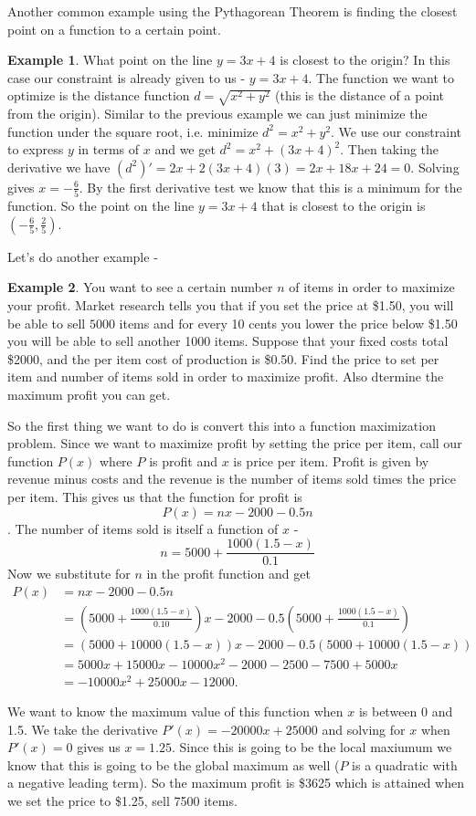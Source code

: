 \documentclass[12pt,reqno]{article}
\theoremstyle{definition}
\newtheorem*{Example}{Example}
\begin{document}
	Another common example using the Pythagorean Theorem is finding the closest point on a function to a certain point. 
	\begin{Example}
		What point on the line $y = 3x + 4$ is closest to the origin? In this case our constraint is already given to us - $y = 3x + 4$. The function we want to optimize is the distance function $d = \sqrt{x^2 + y^2}$ (this is the distance of a point from the origin). Similar to the previous example we can just minimize the function under the square root, i.e. minimize $d^2 = x^2 + y^2$. We use our constraint to express $y$ in terms of $x$ and we get $d^2 = x^2 + (3x + 4)^2$. Then taking the derivative we have $(d^2)' = 2x + 2(3x + 4)(3) = 2x + 18x + 24 = 0$. Solving gives $x = -\frac{6}{5}$. By the first derivative test we know that this is a minimum for the function. So the point on the line $y = 3x + 4$ that is closest to the origin is $\left(-\frac{6}{5}, \frac{2}{5}\right)$. 
	\end{Example}
	
	Let's do another example - 
	\begin{Example}
		You want to see a certain number $n$ of items in order to maximize your profit. Market research tells you that if you set the price at \$1.50, you will be able to sell $5000$ items and for every 10 cents you lower the price below \$1.50 you will be able to sell another 1000 items. Suppose that your fixed costs total \$2000, and the per item cost of production is \$0.50. Find the price to set per item and number of items sold in order to maximize profit. Also dtermine the maximum profit you can get. 
		
		So the first thing we want to do is convert this into a function maximization problem. Since we want to maximize profit by setting the price per item, call our function $P(x)$ where $P$ is profit and $x$ is price per item. Profit is given by revenue minus costs and the revenue is the number of items sold times the price per item. This gives us that the function for profit is $$P(x) = nx - 2000 - 0.5n$$. The number of items sold is itself a function of $x$ - $$n = 5000 +\frac{1000 (1.5 - x)}{0.1}$$ Now we substitute for $n$ in the profit function and get 
		\begin{align*}
			P(x) &= nx - 2000 -0.5n \\
				 &= \left(5000 + \frac{1000(1.5 - x)}{0.10}\right)x - 2000 - 0.5\left(5000 + \frac{1000(1.5 - x)}{0.1}\right) \\
				 &= (5000 + 10000(1.5 - x))x - 2000 - 0.5(5000 + 10000(1.5 - x)) \\
				 &= 5000x + 15000x - 10000x^2 - 2000 - 2500 - 7500 + 5000x \\
				 &= -10000x^2 + 25000x - 12000.
		\end{align*}
		
		We want to know the maximum value of this function when $x$ is between 0 and 1.5. We take the derivative $P'(x) = -20000x + 25000$ and solving for $x$ when $P'(x) = 0$ gives us $x = 1.25$. Since this is going to be the local maxiumum we know that this is going to be the global maximum as well ($P$ is a quadratic with a negative leading term). So the maximum profit is \$3625 which is attained when we set the price to \$1.25, sell 7500 items. 
	\end{Example}
\end{document}
